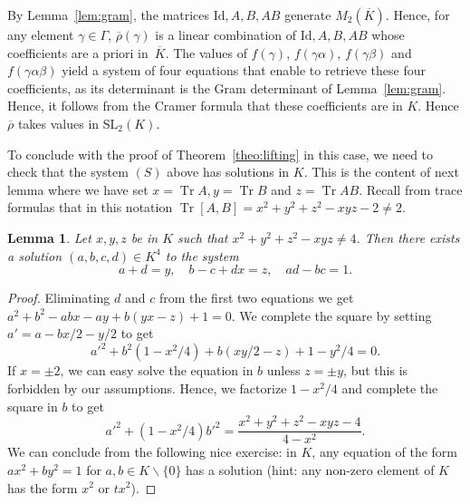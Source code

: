 \documentclass[11pt]{article}
\newtheorem{lemma}[theorem]{Lemma}
\theoremstyle{definition}
\newcommand{\tr}{\operatorname{Tr}}
\newcommand{\SL}{\mathrm{SL}}
\newcommand{\id}{\mathrm{Id}}
\begin{document}
By Lemma~\ref{lem:gram}, the matrices $\id,A,B,AB$ generate
$M_2(\overline{K})$. Hence, for any element $\gamma\in\Gamma$,
$\overline{\rho}(\gamma)$ is a linear combination of $\id,A,B,AB$ whose
coefficients are a priori in~$\overline{K}$. The values of $f(\gamma)$,
$f(\gamma \alpha)$, $f(\gamma\beta)$ and $f(\gamma\alpha\beta)$ yield a system of four equations that enable to retrieve these four coefficients,
as its determinant is the Gram determinant of Lemma~\ref{lem:gram}.
Hence, it follows from the Cramer formula that these coefficients are in
$K$. Hence $\overline{\rho}$ takes values in $\SL_2(K)$.

To conclude with the proof of Theorem~\ref{theo:lifting} in this case, we
need to check that the system $(S)$ above has solutions in $K$. This is
the content of next lemma where we have set $x=\tr A, y=\tr B$ and
$z=\tr AB$. Recall from trace formulas that in this notation
$\tr [A,B]=x^2+y^2+z^2-xyz-2\ne 2$.

\begin{lemma}\label{ilyaunesolution}
Let $x,y,z$ be in $K$ such that $x^2+y^2+z^2-xyz\ne 4$. Then there exists
a solution $(a,b,c,d)\in K^4$ to the system
\[ a+d=y,\quad b-c+dx=z,\quad ad-bc=1. \]
\end{lemma}
\begin{proof}
Eliminating $d$ and $c$ from the first two equations we get
$a^2+b^2-abx-ay+b(yx-z)+1=0$. We complete the square by setting
$a'=a-bx/2-y/2$ to get
\[ a'^2+b^2(1-x^2/4)+b(xy/2-z)+1-y^2/4=0. \]
If $x=\pm 2$, we can easy solve the equation in $b$ unless $z=\pm y$,
but this is forbidden by our assumptions. Hence, we factorize $1-x^2/4$
and complete the square in $b$ to get
\[
a'^2+(1-x^2/4)b'^2=\frac{x^2+y^2+z^2-xyz-4}{4-x^2}.
\]
We can conclude from the following nice exercise: in $K$, any equation of
the form $ax^2+by^2=1$ for $a,b\in K\smallsetminus\{0\}$ has a solution
(hint: any non-zero element of $K$ has the form $x^2$ or $tx^2$).
\end{proof}
\end{document}
